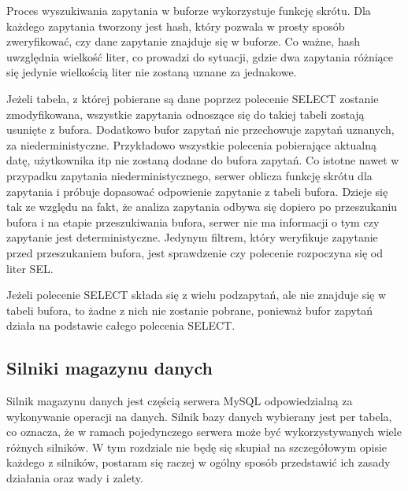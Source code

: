 Proces wyszukiwania zapytania w buforze wykorzystuje funkcję skrótu. Dla każdego zapytania tworzony jest hash, który pozwala w prosty sposób zweryfikować, czy dane zapytanie znajduje się w buforze. Co ważne, hash uwzględnia wielkość liter, co prowadzi do sytuacji, gdzie dwa zapytania różniące się jedynie wielkością liter nie zostaną uznane za jednakowe.

Jeżeli tabela, z której pobierane są dane poprzez polecenie SELECT  zostanie zmodyfikowana, wszystkie zapytania odnoszące się do takiej tabeli zostają usunięte z bufora. Dodatkowo bufor zapytań nie przechowuje zapytań uznanych, za niederministyczne. Przykładowo wszystkie polecenia pobierające aktualną datę, użytkownika itp nie zostaną dodane do bufora zapytań. Co istotne nawet w przypadku zapytania niederministycznego, serwer oblicza funkcję skrótu dla zapytania i próbuje dopasować odpowienie zapytanie z tabeli bufora. Dzieje się tak ze względu na fakt, że analiza zapytania odbywa się dopiero po przeszukaniu bufora i na etapie przeszukiwania bufora, serwer nie ma informacji o tym czy zapytanie jest deterministyczne. Jedynym filtrem, który weryfikuje zapytanie przed przeszukaniem bufora, jest sprawdzenie czy polecenie rozpoczyna się od liter SEL.

Jeżeli polecenie SELECT składa się z wielu podzapytań, ale nie znajduje się w tabeli bufora, to żadne z nich nie zostanie pobrane, ponieważ bufor zapytań działa na podstawie całego polecenia SELECT.

\subsection{Silniki magazynu danych}
Silnik magazynu danych jest częścią serwera MySQL odpowiedzialną za wykonywanie operacji na danych. Silnik bazy danych wybierany jest per tabela, co oznacza, że w ramach pojedynczego serwera może być wykorzystywanych wiele różnych silników. W tym rozdziale nie będę się skupiał na szczegółowym opisie każdego z silników, postaram się raczej w ogólny sposób przedstawić ich zasady działania oraz wady i zalety.
